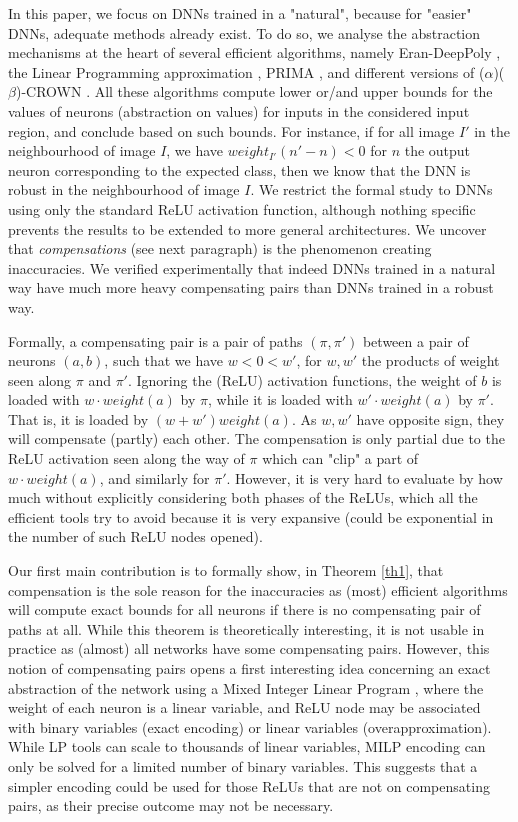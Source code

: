 In this paper, we focus on DNNs trained in a "natural", 
because for "easier" DNNs, adequate methods already exist. 
To do so, we analyse the abstraction mechanisms at the heart of several efficient algorithms, namely Eran-DeepPoly \cite{deeppoly}, the Linear Programming approximation \cite{MILP}, PRIMA \cite{prima}, and different versions of ($\alpha$)($\beta$)-CROWN \cite{crown}. All these algorithms compute lower or/and upper bounds for the values of neurons (abstraction on values) for inputs in the considered input region, and conclude based on such bounds. For instance, if for all image $I'$ in the neighbourhood of image $I$, we have $weight_{I'}(n'-n) < 0$ for $n$ the output neuron corresponding to the expected class, then we know that the DNN is robust in the neighbourhood of image $I$. We restrict the formal study to DNNs using only the standard ReLU activation function, although nothing specific prevents the results to be extended to more general architectures. We uncover that {\em compensations} (see next paragraph) is the phenomenon creating inaccuracies. We verified experimentally that indeed DNNs trained in a natural way have much more heavy compensating pairs than DNNs trained in a robust way.

Formally, a compensating pair is a pair of paths $(\pi,\pi')$ between a pair of neurons $(a,b)$, such that we have $w < 0 < w'$, for $w,w'$ the products of weight seen along $\pi$ and $\pi'$. Ignoring the (ReLU) activation functions, the weight of $b$ is loaded with $w \cdot weight(a)$ by $\pi$, while it is loaded with $w' \cdot weight(a)$ by $\pi'$. That is, it is loaded by $(w+w') weight(a)$. As $w,w'$ have opposite sign, they will compensate (partly) each other. The compensation is only partial due to the ReLU activation seen along the way of $\pi$ which can "clip" a part of $w \cdot weight(a)$, and similarly for $\pi'$. However, it is very hard to evaluate by how much without explicitly considering both phases of the ReLUs, which all the efficient tools try to avoid because it is very expansive (could be exponential in the number of such ReLU nodes opened).

Our first main contribution is to formally show, in Theorem \ref{th1}, that compensation is the sole reason for the inaccuracies as (most) efficient algorithms will compute exact bounds for all neurons if there is no compensating pair of paths at all.
While this theorem is theoretically interesting, it is not usable in practice as (almost) all networks have some compensating pairs. However, this notion of compensating pairs opens a first interesting idea concerning an exact abstraction of the network using a Mixed Integer Linear Program \cite{MILP}, where the weight of each neuron is a linear variable, and ReLU node may be associated with binary variables (exact encoding) or linear variables (overapproximation). While LP tools can scale to thousands of linear variables, MILP encoding can only be solved for a limited number of binary variables. This suggests that a simpler encoding could be used for those ReLUs that are not on compensating pairs, as their precise outcome may not be necessary.

